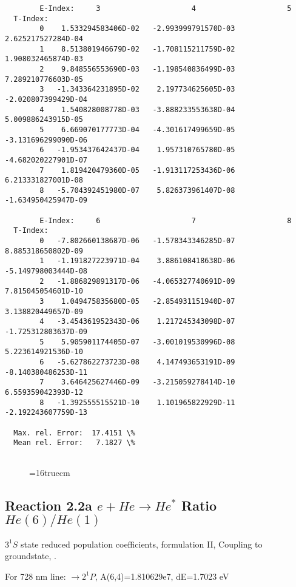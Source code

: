 \documentclass[12pt,dvipdfmx]{article}
\begin{document}
{\begin{small}
\begin{verbatim}
        E-Index:     3                     4                     5
  T-Index:
        0    1.533294583406D-02   -2.993999791570D-03    2.625217527284D-04
        1    8.513801946679D-02   -1.708115211759D-02    1.908032465874D-03
        2    9.848556553690D-03   -1.198540836499D-03    7.289210776603D-05
        3   -1.343364231895D-02    2.197734625605D-03   -2.020807399429D-04
        4    1.540828008778D-03   -3.888233553638D-04    5.009886243915D-05
        5    6.669070177773D-04   -4.301617499659D-05   -3.131696299090D-06
        6   -1.953437642437D-04    1.957310765780D-05   -4.682020227901D-07
        7    1.819420479360D-05   -1.913117253436D-06    6.213331827001D-08
        8   -5.704392451980D-07    5.826373961407D-08   -1.634950425947D-09

        E-Index:     6                     7                     8
  T-Index:
        0   -7.802660138687D-06   -1.578343346285D-07    8.885318650802D-09
        1   -1.191827223971D-04    3.886108418638D-06   -5.149798003444D-08
        2   -1.886829891317D-06   -4.065327740691D-09    7.815045054601D-10
        3    1.049475835680D-05   -2.854931151940D-07    3.138820449657D-09
        4   -3.454361952343D-06    1.217245343098D-07   -1.725312803637D-09
        5    5.905901174405D-07   -3.001019530996D-08    5.223614921536D-10
        6   -5.627862273723D-08    4.147493653191D-09   -8.140380486253D-11
        7    3.646425627446D-09   -3.215059278414D-10    6.559359042393D-12
        8   -1.392555515521D-10    1.101965822929D-11   -2.192243607759D-13

  Max. rel. Error:  17.4151 \%
  Mean rel. Error:   7.1827 \%


\end{verbatim}\end{small}
\begin{figure} \label{2.1.8lr2o}
\epsfxsize=16truecm
\end{figure}
\newpage



\subsection{
  Reaction 2.2a $e + He \rightarrow He^*  $ Ratio $He(6)/He(1)$
}

  $3^1S$ state
  reduced population coefficients, formulation II,
  Coupling to groundstate, \cite{kn:Fujimoto}.

  For 728 nm line:  $\rightarrow 2^1P$, A(6,4)=1.810629e7, dE=1.7023 eV

}
\end{document}
